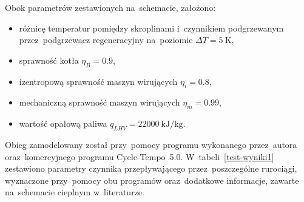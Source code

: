 Obok parametrów zestawionych na~schemacie, założono:

\begin{itemize}
	\item różnicę temperatur pomiędzy skroplinami i~czynnikiem
		podgrzewanym przez~podgrzewacz regeneracyjny na~poziomie
		$\Delta T = \SI{5}{\kelvin}$,
	\item sprawność kotła $\eta_B = \num{0,9}$,
	\item izentropową sprawność maszyn wirujących $\eta_i = \num{0,8}$,
	\item mechaniczną sprawność maszyn wirujących $\eta_m = \num{0,99}$,
	\item wartość opałową paliwa $q_{LHV} =
		\SI{22000}{\kilo\joule\per\kilogram}$.
\end{itemize}

Obieg zamodelowany został przy~pomocy programu wykonanego przez~autora
oraz~komercyjnego programu Cycle-Tempo~5.0. W~tabeli~\ref{test-wyniki1}
zestawiono parametry czynnika przepływającego przez~poszczególne
rurociągi, wyznaczone przy~pomocy obu programów oraz~dodatkowe
informacje, zawarte na~schemacie cieplnym w~literaturze.


